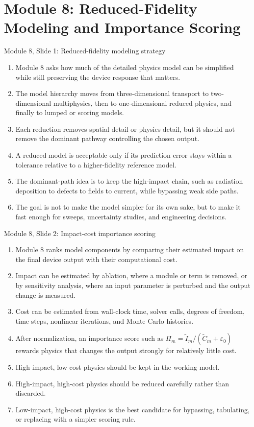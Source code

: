 \documentclass[11pt]{article}
\begin{document}
\section{Module 8: Reduced-Fidelity Modeling and Importance Scoring}

\begin{slidebox}{Module 8, Slide 1: Reduced-fidelity modeling strategy}
\begin{enumerate}
\item Module 8 asks how much of the detailed physics model can be simplified while still preserving the device response that matters.
\item The model hierarchy moves from three-dimensional transport to two-dimensional multiphysics, then to one-dimensional reduced physics, and finally to lumped or scoring models.
\item Each reduction removes spatial detail or physics detail, but it should not remove the dominant pathway controlling the chosen output.
\item A reduced model is acceptable only if its prediction error stays within a tolerance relative to a higher-fidelity reference model.
\item The dominant-path idea is to keep the high-impact chain, such as radiation deposition to defects to fields to current, while bypassing weak side paths.
\item The goal is not to make the model simpler for its own sake, but to make it fast enough for sweeps, uncertainty studies, and engineering decisions.
\end{enumerate}
\end{slidebox}

\begin{slidebox}{Module 8, Slide 2: Impact-cost importance scoring}
\begin{enumerate}
\item Module 8 ranks model components by comparing their estimated impact on the final device output with their computational cost.
\item Impact can be estimated by ablation, where a module or term is removed, or by sensitivity analysis, where an input parameter is perturbed and the output change is measured.
\item Cost can be estimated from wall-clock time, solver calls, degrees of freedom, time steps, nonlinear iterations, and Monte Carlo histories.
\item After normalization, an importance score such as \(\Pi_m=\widetilde I_m/(\widetilde C_m+\varepsilon_0)\) rewards physics that changes the output strongly for relatively little cost.
\item High-impact, low-cost physics should be kept in the working model.
\item High-impact, high-cost physics should be reduced carefully rather than discarded.
\item Low-impact, high-cost physics is the best candidate for bypassing, tabulating, or replacing with a simpler scoring rule.
\end{enumerate}
\end{slidebox}
\end{document}
